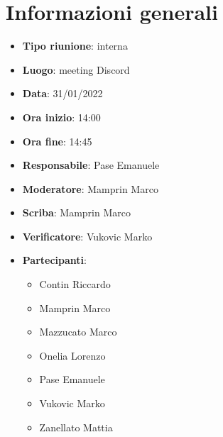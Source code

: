 \section{Informazioni generali}
\begin{itemize}
  \item \textbf{Tipo riunione}: interna
  \item \textbf{Luogo}: meeting Discord
  \item \textbf{Data}: 31/01/2022
  \item \textbf{Ora inizio}: 14:00
  \item \textbf{Ora fine}: 14:45
  \item \textbf{Responsabile}: Pase Emanuele
  \item \textbf{Moderatore}: Mamprin Marco
  \item \textbf{Scriba}: Mamprin Marco
  \item \textbf{Verificatore}: Vukovic Marko
  \item \textbf{Partecipanti}:
  \begin{itemize}
    \item Contin Riccardo
    \item Mamprin Marco
    \item Mazzucato Marco
    \item Onelia Lorenzo
    \item Pase Emanuele
    \item Vukovic Marko
    \item Zanellato Mattia
  \end{itemize}
\end{itemize}

